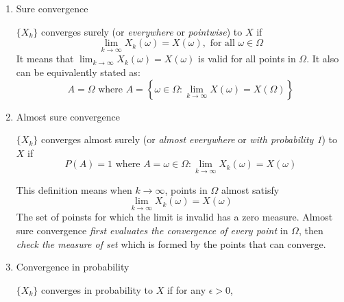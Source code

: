\begin{enumerate}
\begin{enumerate}
            \item
                  Sure convergence
                  \begin{definition}
                    $\{X_{k}\}$ converges surely (or \textit{everywhere} or \textit{pointwise}) to $X$ if
                    \begin{equation*}
                      \lim_{k \to \infty}X_{k}(\omega)=X(\omega), \text{ for all } \omega \in \Omega
                    \end{equation*}
                    It means that $\lim_{k \to \infty}X_{k}(\omega)=X(\omega)$ is valid for all points in $\Omega$. It also can be
                    equivalently stated as:
                    \begin{equation*}
                      A=\Omega \text{ where } A=\left\{\omega \in \Omega: \lim_{k \to \infty} X(\omega)=X(\Omega)\right\}
                    \end{equation*}
                  \end{definition}
            \item
                  Almost sure convergence
                  \begin{definition}
                    $\{X_{k}\}$ converges almost surely (or \textit{almost everywhere} or \textit{with probability 1}) to $X$ if
                    \begin{equation*}
                      P(A)=1 \text{ where } A={\omega \in \Omega: \lim_{k \to \infty}X_{k}(\omega)=X(\omega)}
                    \end{equation*}
                  \end{definition}
                  This definition means when $k \to \infty$, points in $\Omega$ almost satisfy
                  \begin{equation*}
                    \lim_{k \to \infty}X_{k}(\omega)=X(\omega)
                  \end{equation*}
                  The set of poinsts for which the limit is invalid has a zero measure. Almost sure convergence \emph{first evaluates
                    the convergence of every point} in $\Omega$, then \emph{check the measure of set} which is formed by the points
                  that can converge.
            \item
                  Convergence in probability
                  \begin{definition}
                    $\{X_{k}\}$ converges in probability to $X$ if for any $\epsilon > 0$,
                    \begin{equation*}

\end{equation*}
\end{definition}
\end{enumerate}
\end{enumerate}
